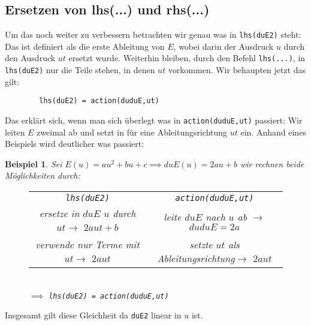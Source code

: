 \documentclass[a4paper, 12pt]{scrartcl}
\newtheorem*{Bsp}{Beispiel}
\begin{document}
	\subsection{Ersetzen von lhs(...) und rhs(...)}
	Um das noch weiter zu verbessern betrachten wir genau was in \verb|lhs(duE2)| steht: Das ist definiert als die erste Ableitung von $E$, wobei darin der Ausdruck $u$ durch den Ausdruck $ut$ ersetzt wurde. Weiterhin bleiben, durch den Befehl \verb|lhs(...)|, in \verb|lhs(duE2)| nur die Teile stehen, in denen $ut$ vorkommen. Wir behaupten jetzt das gilt:
	\begin{verbatim}
		lhs(duE2) = action(duduE,ut)
	\end{verbatim}
	Das erklärt sich, wenn man sich überlegt was in \verb|action(duduE,ut)| passiert: Wir leiten $E$ zweimal ab und setzt in für eine Ableitungsrichtung $ut$ ein. Anhand eines Beispiels wird deutlicher was passiert:
	\begin{Bsp}
		Sei $E(u) = au^2+bu+c\implies duE(u)=2au+b$ wir rechnen beide Möglichkeiten durch:
		\begin{figure}[H]
			\centering
				\begin{tabular}{cc}
					\verb|lhs(duE2)| & \verb|action(duduE,ut)| \\
					ersetze in $duE$ $u$ durch $ut\rightarrow$ $2aut+b$ & leite $duE$ nach $u$ ab $\rightarrow$ $duduE=2a$
					\\
					verwende nur Terme mit $ut\rightarrow$ $2aut$ & setzte $ut$ als Ableitungsrichtung$\rightarrow$ $2aut$
				\end{tabular}
			\\
			$\implies$ \verb|lhs(duE2) = action(duduE,ut)|
		\end{figure}
	\end{Bsp}
Insgesamt gilt diese Gleichheit da \verb|duE2| linear in $u$ ist.
\end{document}
